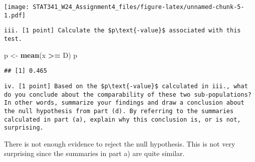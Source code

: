 \documentclass[
]{article}
\newenvironment{Shaded}{\begin{snugshade}}{\end{snugshade}}
\newcommand{\FunctionTok}[1]{\textcolor[rgb]{0.13,0.29,0.53}{\textbf{#1}}}
\newcommand{\NormalTok}[1]{#1}
\newcommand{\OtherTok}[1]{\textcolor[rgb]{0.56,0.35,0.01}{#1}}
\newcommand{\SpecialCharTok}[1]{\textcolor[rgb]{0.81,0.36,0.00}{\textbf{#1}}}
\begin{document}
\texttt{[image: STAT341\_W24\_Assignment4\_files/figure-latex/unnamed-chunk-5-1.pdf]}

\begin{verbatim}
iii. [1 point] Calculate the $p\text{-value}$ associated with this test.
\end{verbatim}

\begin{Shaded}
\begin{Highlighting}[]
\NormalTok{p }\OtherTok{\textless{}{-}} \FunctionTok{mean}\NormalTok{(x }\SpecialCharTok{\textgreater{}=}\NormalTok{ D)}
\NormalTok{p}
\end{Highlighting}
\end{Shaded}

\begin{verbatim}
## [1] 0.465
\end{verbatim}

\begin{verbatim}
iv. [1 point] Based on the $p\text{-value}$ calculated in iii., what do you conclude about the comparability of these two sub-populations? In other words, summarize your findings and draw a conclusion about the null hypothesis from part (d). By referring to the summaries calculated in part (a), explain why this conclusion is, or is not, surprising.
\end{verbatim}

There is not enough evidence to reject the null hypothesis. This is not
very surprising since the summaries in part a) are quite similar.
\end{document}
